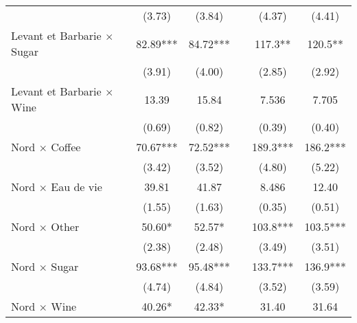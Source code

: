 {\begin{tabular}{l*{6}{c}}
                    &                     &      (3.73)         &      (3.84)         &                     &      (4.37)         &      (4.41)         \\
[1em]
Levant et Barbarie $\times$ Sugar&                     &       82.89***&       84.72***&                     &       117.3** &       120.5** \\
                    &                     &      (3.91)         &      (4.00)         &                     &      (2.85)         &      (2.92)         \\
[1em]
Levant et Barbarie $\times$ Wine&                     &       13.39         &       15.84         &                     &       7.536         &       7.705         \\
                    &                     &      (0.69)         &      (0.82)         &                     &      (0.39)         &      (0.40)         \\
[1em]
Nord $\times$ Coffee&                     &       70.67***&       72.52***&                     &       189.3***&       186.2***\\
                    &                     &      (3.42)         &      (3.52)         &                     &      (4.80)         &      (5.22)         \\
[1em]
Nord $\times$ Eau de vie&                     &       39.81         &       41.87         &                     &       8.486         &       12.40         \\
                    &                     &      (1.55)         &      (1.63)         &                     &      (0.35)         &      (0.51)         \\
[1em]
Nord $\times$ Other &                     &       50.60*  &       52.57*  &                     &       103.8***&       103.5***\\
                    &                     &      (2.38)         &      (2.48)         &                     &      (3.49)         &      (3.51)         \\
[1em]
Nord $\times$ Sugar &                     &       93.68***&       95.48***&                     &       133.7***&       136.9***\\
                    &                     &      (4.74)         &      (4.84)         &                     &      (3.52)         &      (3.59)         \\
[1em]
Nord $\times$ Wine  &                     &       40.26*  &       42.33*  &                     &       31.40         &       31.64         \\

\end{tabular}}
